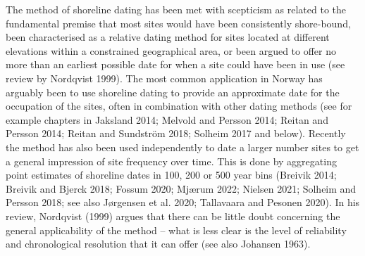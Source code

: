 \documentclass[
]{article}
\begin{document}
The method of shoreline dating has been met with scepticism as related to the fundamental premise that most sites would have been consistently shore-bound, been characterised as a relative dating method for sites located at different elevations within a constrained geographical area, or been argued to offer no more than an earliest possible date for when a site could have been in use (see review by Nordqvist 1999). The most common application in Norway has arguably been to use shoreline dating to provide an approximate date for the occupation of the sites, often in combination with other dating methods (see for example chapters in Jaksland 2014; Melvold and Persson 2014; Reitan and Persson 2014; Reitan and Sundström 2018; Solheim 2017 and below). Recently the method has also been used independently to date a larger number sites to get a general impression of site frequency over time. This is done by aggregating point estimates of shoreline dates in 100, 200 or 500 year bins (Breivik 2014; Breivik and Bjerck 2018; Fossum 2020; Mjærum 2022; Nielsen 2021; Solheim and Persson 2018; see also Jørgensen et al. 2020; Tallavaara and Pesonen 2020). In his review, Nordqvist (1999) argues that there can be little doubt concerning the general applicability of the method -- what is less clear is the level of reliability and chronological resolution that it can offer (see also Johansen 1963).
\end{document}
